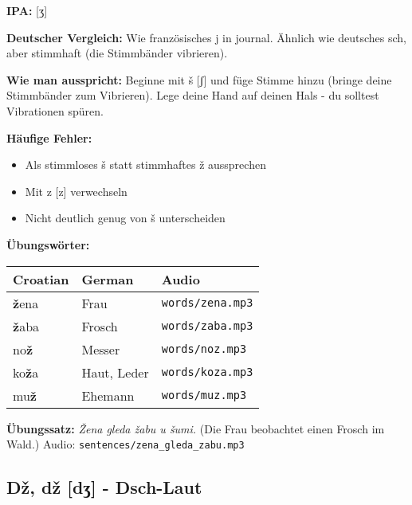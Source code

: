 \begin{tcolorbox}[colback=lightblue!30, colframe=croatianblue, title=\textbf{Ž, ž}]

\textbf{IPA:} [ʒ]

\textbf{Deutscher Vergleich:}
Wie französisches \glqq j\grqq{} in \glqq journal\grqq{}. Ähnlich wie deutsches \glqq sch\grqq{}, aber stimmhaft (die Stimmbänder vibrieren).

\textbf{Wie man ausspricht:}
Beginne mit \glqq š\grqq{} [ʃ] und füge Stimme hinzu (bringe deine Stimmbänder zum Vibrieren). Lege deine Hand auf deinen Hals - du solltest Vibrationen spüren.

\textbf{Häufige Fehler:}
\begin{itemize}
    \item Als stimmloses \glqq š\grqq{} statt stimmhaftes \glqq ž\grqq{} aussprechen
    \item Mit \glqq z\grqq{} [z] verwechseln
    \item Nicht deutlich genug von \glqq š\grqq{} unterscheiden
\end{itemize}

\textbf{Übungswörter:}
\begin{tabular}{lll}
\textbf{Croatian} & \textbf{German} & \textbf{Audio} \\
\midrule
\textbf{ž}ena & Frau & \texttt{words/zena.mp3} \\
\textbf{ž}aba & Frosch & \texttt{words/zaba.mp3} \\
no\textbf{ž} & Messer & \texttt{words/noz.mp3} \\
ko\textbf{ž}a & Haut, Leder & \texttt{words/koza.mp3} \\
mu\textbf{ž} & Ehemann & \texttt{words/muz.mp3} \\
\end{tabular}

\textbf{Übungssatz:}
\textit{Žena gleda žabu u šumi.}
(Die Frau beobachtet einen Frosch im Wald.)
Audio: \texttt{sentences/zena\_gleda\_zabu.mp3}

\end{tcolorbox}

\subsection{Dž, dž [dʒ] - \glqq Dsch-Laut\grqq{}}

